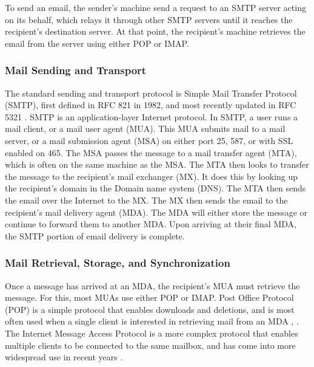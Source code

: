 \documentclass[pageno]{jpaper}
\begin{document}
To send an email, the sender's machine send a request to an SMTP server acting on its behalf, which relays it through other SMTP servers until it reaches the recipient's destination server. At that point, the recipient's machine retrieves the email from the server using either POP or IMAP.

\subsubsection{Mail Sending and Transport}
The standard sending and transport protocol is Simple Mail Transfer Protocol (SMTP), first defined in RFC 821 \cite{postel1982rfc} in 1982, and most recently updated in RFC 5321 \cite{klensin2008rfc}. SMTP is an application-layer Internet protocol. In SMTP, a user runs a mail client, or a mail user agent (MUA). This MUA submits mail to a mail server, or a mail submission agent (MSA) on either port 25, 587, or with SSL enabled on 465. The MSA passes the message to a mail transfer agent (MTA), which is often on the same machine as the MSA. The MTA then looks to transfer the message to the recipient's mail exchanger (MX). It does this by looking up the recipient's domain in the Domain name system (DNS). The MTA then sends the email over the Internet to the MX. The MX then sends the email to the recipient's mail delivery agent (MDA). The MDA will either store the message or continue to forward them to another MDA. Upon arriving at their final MDA, the SMTP portion of email delivery is complete.


\label{legacyimap}
\subsubsection{Mail Retrieval, Storage, and Synchronization}
Once a message has arrived at an MDA, the recipient's MUA must retrieve the message. For this, most MUAs use either POP or IMAP. Post Office Protocol (POP) is a simple protocol that enables downloads and deletions, and is most often used when a single client is interested in retrieving mail from an MDA \cite{reynolds1984post}, \cite{myers1996post}. The Internet Message Access Protocol is a more complex protocol that enables multiple clients to be connected to the same mailbox, and has come into more widespread use in recent years \cite{rfc3501}.
\end{document}
